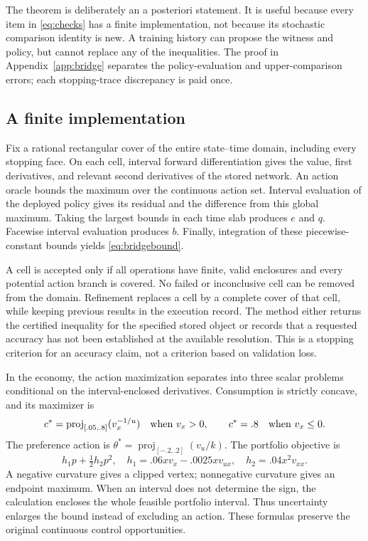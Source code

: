 The theorem is deliberately an a posteriori statement. It is useful because every item in \eqref{eq:checks} has a finite implementation, not because its stochastic comparison identity is new. A training history can propose the witness and policy, but cannot replace any of the inequalities. The proof in Appendix~\ref{app:bridge} separates the policy-evaluation and upper-comparison errors; each stopping-trace discrepancy is paid once.

\subsection{A finite implementation}
Fix a rational rectangular cover of the entire state--time domain, including every stopping face. On each cell, interval forward differentiation gives the value, first derivatives, and relevant second derivatives of the stored network. An action oracle bounds the maximum over the continuous action set. Interval evaluation of the deployed policy gives its residual and the difference from this global maximum. Taking the largest bounds in each time slab produces $e$ and $q$. Facewise interval evaluation produces $b$. Finally, integration of these piecewise-constant bounds yields \eqref{eq:bridgebound}.

A cell is accepted only if all operations have finite, valid enclosures and every potential action branch is covered. No failed or inconclusive cell can be removed from the domain. Refinement replaces a cell by a complete cover of that cell, while keeping previous results in the execution record. The method either returns the certified inequality for the specified stored object or records that a requested accuracy has not been established at the available resolution. This is a stopping criterion for an accuracy claim, not a criterion based on validation loss.

In the economy, the action maximization separates into three scalar problems conditional on the interval-enclosed derivatives. Consumption is strictly concave, and its maximizer is
\[
 c^*=\operatorname{proj}_{[.05,.8]}(v_x^{-1/u})\quad\hbox{when }v_x>0,
 \qquad c^*=.8\quad\hbox{when }v_x\leq0.
\]
The preference action is $\theta^*=\operatorname{proj}_{[-.2,.2]}(v_u/k)$. The portfolio objective is
\[
 h_1p+\tfrac12h_2p^2,\quad
 h_1=.06xv_x-.0025xv_{ux},\quad h_2=.04x^2v_{xx}.
\]
A negative curvature gives a clipped vertex; nonnegative curvature gives an endpoint maximum. When an interval does not determine the sign, the calculation encloses the whole feasible portfolio interval. Thus uncertainty enlarges the bound instead of excluding an action. These formulas preserve the original continuous control opportunities.

